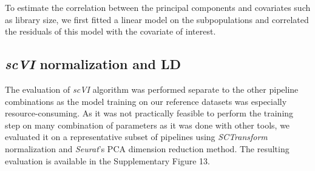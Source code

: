 \documentclass{bmcart}
\begin{document}
To estimate the correlation between the principal components and covariates such as library size, we first fitted a linear model on the subpopulations and correlated the residuals of this model with the covariate of interest.

\subsection*{\textit{scVI} normalization and LD}

The evaluation of \textit{scVI} algorithm was performed separate to the other pipeline combinations as the model training on our reference datasets was especially resource-consuming. As it was not practically feasible to perform the training step on many combination of parameters as it was done with other tools, we evaluated it on a representative subset of pipelines using \textit{SCTransform} normalization and \textit{Seurat}'s PCA dimension reduction method. The resulting evaluation is available in the Supplementary Figure 13. 

\end{document}
